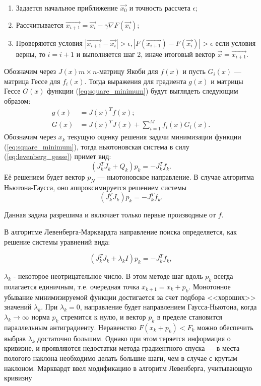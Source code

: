 \begin{enumerate}
 \item Задается начальное приближение $\vec{x_0}$ и точность рассчета $\epsilon$;
 \item Рассчитывается $ \vec{x_{i+1}} =  \vec{x_{i}} - \gamma \nabla F(\vec{x_{i}}) $;
 \item Проверяются условия $\left| \vec{x_{i+1}} - \vec{x_{i}} \right| > \epsilon, \left| F(\vec{x_{i+1}}) - F(\vec{x_{i}}) \right| > \epsilon $ если условия верны, то $i = i + 1$ 
 и выполняется шаг 2, иначе итоговый вектор $ \vec{x} = \vec{x_{i+1}} $.
\end{enumerate}
Обозначим через $J(x) m \times n$-матрицу Якоби для $f(x)$ и пусть $G_i(x)$ --- 
матрица Гессе для $f_i(x)$. Тогда выражения для градиента $g(x)$ и матрицы Гессе $G(x)$ функции
(\ref{eq:square_minimum}) будут выглядеть следующим образом:
\begin{equation}
\begin{split}
 g(x) &= J(x)^T f(x); \\
 G(x) &= J(x)^T J(x) + \displaystyle \sum_{i=1}^M f_i(x) G_i(x).
\end{split}
 \label{eq:levenberg_gesse}
\end{equation}
Обозначим через $x_k$ текущую оценку решения задачи минимизации функции (\ref{eq:square_minimum}),
тогда ньютоновская система в силу (\ref{eq:levenberg_gesse}) примет вид:
\begin{equation}
 \left(J^T_k J_k + Q_k\right) p_k = -J^T_k f_k.
\end{equation}
Её решением будет вектор $p_N$ --- ньютоновское направление. В случае алгоритма Ньютона-Гаусса, оно аппроксимируется  решением системы 
\begin{equation}
 (J^T_k J_k ) p_k = -J^T_k f_k.
\end{equation}

Данная задача разрешима и включает только первые производные от $f$.

В алгоритме Левенберга-Марквардта направление поиска 
определяется, как решение системы уравнений вида:

\begin{equation}
 (J^T_k J_k + \lambda_k I) p_k = -J^T_k f_k,
\end{equation}

$\lambda_k$ - некоторое неотрицательное число. В этом методе шаг вдоль $p_k$ всегда 
полагается единичным, т.е. очередная точка $x_{k+1} = x_k + p_k$. Монотонное убывание минимизируемой
функции достигается за счет подбора <<хороших>> значений $\lambda_k$. При $\lambda_k = 0$, направление будет 
направлением Гаусса-Ньютона, когда $\lambda_k \to \infty$ норма $p_k$ стремится к нулю, и вектор
$p_k$ в пределе становится параллельным антиградиенту. Неравенство $F (x_k + p_k) < F_k$ можно обеспечить
выбрав $\lambda_k$ достаточно большим. Однако при этом теряется информация о кривизне, и проявляются
недостатки метода градиентного спуска --- в места пологого наклона необходимо делать большие шаги, чем в случае
с крутым наклоном. Марквардт ввел модификацию в алгоритм Левенберга, учитывающую кривизну

